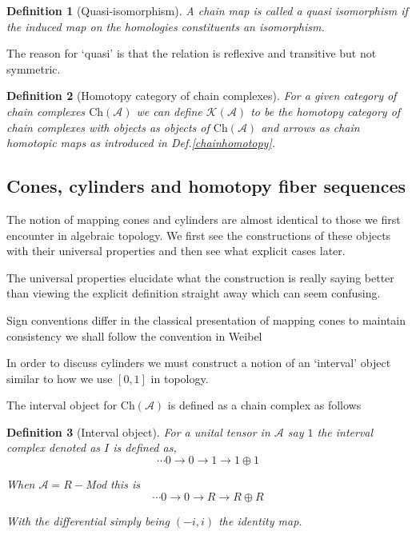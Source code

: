 \documentclass[12pt]{article}
\numberwithin{equation}{section}
\newtheorem{definition}{Definition}[section]
\begin{document}
	
	
	
	\begin{definition}[Quasi-isomorphism]
		A chain map is called a quasi isomorphism if the induced map on the homologies constituents an isomorphism.
	\end{definition}
	The reason for `quasi' is that the relation is reflexive and transitive but not symmetric. 
	\begin{definition}[Homotopy category of chain complexes]
		For a given category of chain complexes $\mathrm{Ch}(\mathcal{A})$ we can define $\mathcal{K}(\mathcal{A})$ to be the homotopy category of chain complexes with objects as objects of $\mathrm{Ch}(\mathcal{A})$ and arrows as chain homotopic maps as introduced in Def.\ref{chainhomotopy}.
	\end{definition}
	
	\subsection{Cones, cylinders and homotopy fiber sequences}
	
	
	The notion of mapping cones and cylinders are almost identical to those we first encounter in algebraic topology. We first see the constructions of these objects with their universal properties and then see what explicit cases later.
	
	The universal properties elucidate what the construction is really saying better than viewing the explicit definition straight away which can seem confusing.
	
		Sign conventions differ in the classical presentation of mapping cones to maintain consistency we shall follow the convention in Weibel \cite{weibel_1994}

	In order to discuss cylinders we must construct a notion of an `interval' object similar to how we use $[0,1]$ in topology.
	
	
	The interval object for $\mathrm{Ch}(\mathcal{A})$ is defined as a chain complex as follows
	\begin{definition}[Interval object]
		For a unital tensor in $\mathcal{A}$ say $1$ the interval complex denoted as $I$ is defined as,
		\[ \cdots 0 \to 0 \to 1 \to 1 \oplus 1 \]
		
		When $\mathcal{A}=R-$Mod this is 
		\[ \cdots 0 \to 0 \to R \to R \oplus R \]
		
		With the differential simply being $(-i,i)$ the identity map.
	\end{definition}
	
\end{document}
